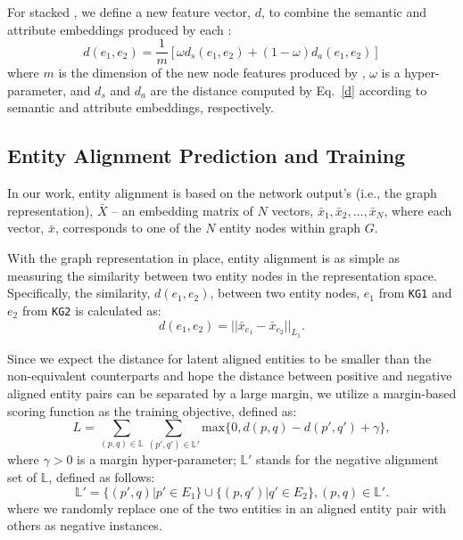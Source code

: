     For stacked \HRGCNs, we define a new feature vector, $d$, to combine the semantic and attribute embeddings produced by each \HRGCN:
	\begin{equation}
		d(e_1,e_2)=\frac{1}{m}[\omega d_s(e_1,e_2)+(1-\omega)d_a(e_1,e_2)]
	\end{equation}
	where $m$ is the dimension of the new node features produced by \HRGCNs, $\omega$ is a hyper-parameter, and $d_s$ and $d_a$ are the distance computed by Eq.~\ref{d} according to semantic and attribute embeddings, respectively.
	
	\subsection{Entity Alignment Prediction and Training\label{prediction}}
   In our work, entity alignment is based on the network output's (i.e., the graph representation), $\bar{X}$ -- an embedding matrix of $N$ vectors, $\bar{x}_1,\bar{x}_2,...,\bar{x}_N$, where
   each vector, $\bar{x}$, corresponds to one
    of the $N$ entity nodes within graph $G$. 	


 With the graph representation in place, entity alignment is as simple as measuring the similarity between two entity
nodes in the representation space. Specifically, the similarity, $d(e_1,e_2)$, between two entity nodes, $e_1$ from \texttt{KG1} and $e_2$
from \texttt{KG2} is calculated as:
	\begin{equation}
	\label{d}
	d(e_1,e_2)=||\bar{x}_{e_1}-\bar{x}_{e_2}||_{L_1}.
	\end{equation}

	 Since we expect the distance for latent aligned entities to be smaller than the non-equivalent counterparts and hope the distance
between positive and negative aligned entity pairs can be separated by a large margin, we utilize a margin-based scoring function as the
training objective, defined as:
	\begin{equation}
	L=\sum\limits_{(p,q)\in \mathbb{L}}\sum\limits_{(p',q')\in \mathbb{L'}}\mathrm{max}\{0,d(p,q)-d(p',q')+\gamma\},
	\end{equation}
	where $\gamma > 0$ is a margin hyper-parameter; $\mathbb{L'}$ stands for the negative alignment set of $\mathbb{L}$, defined as follows:
	\begin{equation}
	\mathbb{L'}=\{(p',q)|p'\in E_1\}\cup\{(p,q')|q'\in E_2\}, (p,q)\in \mathbb{L'}.
	\end{equation}
	where we randomly replace one of the two entities in an aligned entity pair with others as negative instances.
	

	
	

	
	
